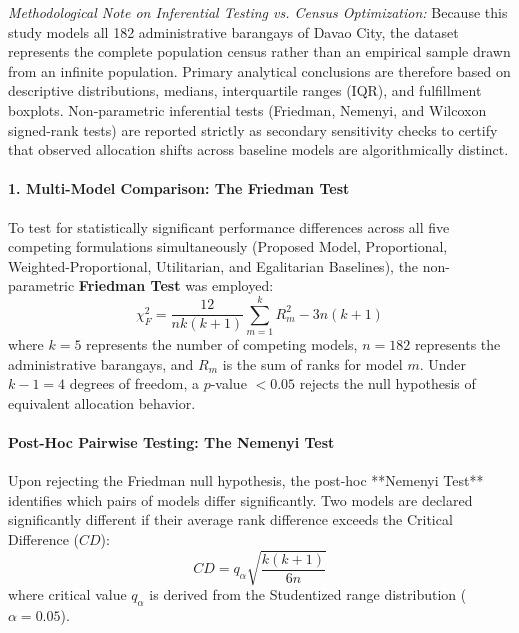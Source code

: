 \noindent \textit{Methodological Note on Inferential Testing vs. Census Optimization:} Because this study models all 182 administrative barangays of Davao City, the dataset represents the complete population census rather than an empirical sample drawn from an infinite population. Primary analytical conclusions are therefore based on descriptive distributions, medians, interquartile ranges (IQR), and fulfillment boxplots. Non-parametric inferential tests (Friedman, Nemenyi, and Wilcoxon signed-rank tests) are reported strictly as secondary sensitivity checks to certify that observed allocation shifts across baseline models are algorithmically distinct.

\paragraph{1. Multi-Model Comparison: The Friedman Test} To test for statistically significant performance differences across all five competing formulations simultaneously (Proposed Model, Proportional, Weighted-Proportional, Utilitarian, and Egalitarian Baselines), the non-parametric \textbf{Friedman Test} was employed:
\begin{equation}
    \chi^2_F = \frac{12}{nk(k + 1)} \sum_{m=1}^k R_m^2 - 3n(k + 1)
\end{equation}
where $k = 5$ represents the number of competing models, $n = 182$ represents the administrative barangays, and $R_m$ is the sum of ranks for model $m$. Under $k - 1 = 4$ degrees of freedom, a $p$-value $< 0.05$ rejects the null hypothesis of equivalent allocation behavior.

\paragraph{Post-Hoc Pairwise Testing: The Nemenyi Test}
Upon rejecting the Friedman null hypothesis, the post-hoc **Nemenyi Test** identifies which pairs of models differ significantly. Two models are declared significantly different if their average rank difference exceeds the Critical Difference ($CD$):
\begin{equation}
    CD = q_\alpha \sqrt{\frac{k(k + 1)}{6n}}
\end{equation}
where critical value $q_\alpha$ is derived from the Studentized range distribution ($\alpha = 0.05$).

